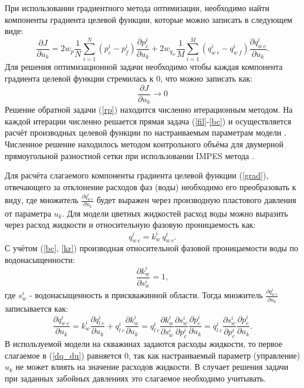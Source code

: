 \documentclass{article}
\begin{document}
При использовании градиентного метода оптимизации, необходимо найти компоненты градиента целевой функции, которые можно записать в следующем виде:
\begin{equation}\label{grad}
\frac{\partial J}{\partial u_k} = 2w_p\frac{1}{N}\sum_{i=1}^N ({p_c^i-p_f^i})\frac{\partial p_c^i}{\partial u_k}+2w_{q_w}\frac{1}{M}\sum_{i=1}^M{\left(q_{w\:c}^i-q_{w\:f}^i\right)}\frac{\partial q_{w\:c}^i}{\partial u_k}.
\end{equation}
Для решения оптимизационной задачи необходимо чтобы каждая компонента градиента целевой функции стремилась к 0, что можно записать как:
\begin{equation} \label{rp}
	 \frac{\partial J}{\partial u_k} \rightarrow 0
\end{equation}
Решение обратной задачи (\ref{rp}) находится численно итерационным методом. На каждой итерации численно решается прямая задача (\ref{fil}-\ref{bc}) и осуществляется расчёт производных целевой функции по настраиваемым параметрам модели \cite{opt}. Численное решение находилось методом контрольного объёма  для двумерной прямоугольной разностной сетки при использовании IMPES метода \cite{azi}.

Для расчёта слагаемого компоненты градиента целевой функции (\ref{grad}), отвечающего за отклонение расходов фаз (воды) необходимо его преобразовать к виду, где множитель $\frac{\partial q_{w\:c}^i}{\partial u_k}$ будет выражен через производную пластового давления от параметра $u_k$. Для модели цветных жидкостей расход воды можно выразить через расход жидкости и относительную фазовую проницаемость как:
 \begin{equation*}
 	q_{w\:c}^i = k_{w}^i \: q_{w\:c}^i.
 \end{equation*}
С учётом (\ref{bc}, \ref{kr}) производная относительной фазовой проницаемости воды по водонасыщенности:
 \begin{equation*}
	\frac{\partial k_{w}^i}{\partial s_w^i} = 1,
\end{equation*}
где $s_w^i$ - водонасыщенность в прискважинной области.
Тогда множитель $\frac{\partial q_{w\:c}^i}{\partial u_k}$ записывается как:
\begin{equation} \label{dq_du}
\frac{\partial q_{w\:c}^i}{\partial u_k} = k_{w}^i \frac{\partial q_{l\:c}^i}{\partial u_k} + q_{l\:c}^i \frac{\partial k_{w}^i}{\partial u_k} = q_{l\:c}^i \frac{\partial k_{w}^i}{\partial s_w^i} \frac{\partial s_w^i}{\partial p_c^i}\frac{\partial p_c^i}{\partial u_k} =  q_{l\:c}^i  \frac{\partial s_w^i}{\partial p_c^i}\frac{\partial p_c^i}{\partial u_k}.
\end{equation}
В используемой модели на скважинах задаются расходы жидкости, то первое слагаемое в (\ref{dq_du}) равняется 0, так как настраиваемый параметр (управление) $u_k$ не может влиять на значение расходов жидкости. В случает решения задачи при заданных забойных давлениях это слагаемое необходимо учитывать.
\end{document}
